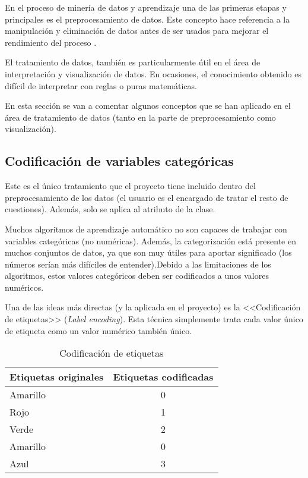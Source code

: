 En el proceso de minería de datos y aprendizaje una de las primeras etapas y
principales es el preprocesamiento de datos. Este concepto hace referencia a la
manipulación y eliminación de datos antes de ser usados para mejorar el
rendimiento del proceso \cite{enwiki:1138293751}.

El tratamiento de datos, también es particularmente útil en el área de
interpretación y visualización de datos. En ocasiones, el conocimiento obtenido
es difícil de interpretar con reglas o puras matemáticas.

En esta sección se van a comentar algunos conceptos que se han aplicado en el
área de tratamiento de datos (tanto en la parte de preprocesamiento como
visualización).

\subsection{Codificación de variables categóricas}
Este es el único tratamiento que el proyecto tiene incluido dentro del
preprocesamiento de los datos (el usuario es el encargado de tratar el resto de
cuestiones). Además, solo se aplica al atributo de la clase.

Muchos algoritmos de aprendizaje automático no son capaces de trabajar con
variables categóricas (no numéricas). Además, la categorización está presente en
muchos conjuntos de datos, ya que son muy útiles para aportar significado (los
números serían más difíciles de entender).Debido a las limitaciones de los
algoritmos, estos valores categóricos deben ser codificados a unos valores
numéricos.

Una de las ideas más directas (y la aplicada en el proyecto) es la
<<Codificación de etiquetas>> (\textit{Label encoding}). Esta técnica
simplemente trata cada valor único de etiqueta como un valor numérico también
único.

\begin{table}[H]
    \centering
\begin{tabular}{l|c}
Etiquetas originales & Etiquetas codificadas \\ \hline
Amarillo             & 0                     \\
Rojo                 & 1                     \\
Verde                & 2                     \\
Amarillo             & 0                     \\
Azul                 & 3                    
\end{tabular}
\caption{Codificación de etiquetas}
\end{table}

